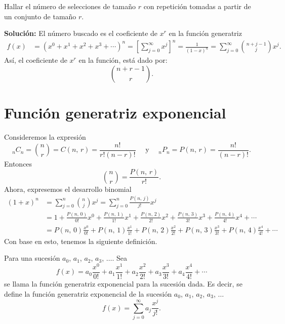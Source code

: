 \begin{myexample}
    Hallar el número de selecciones de tamaño $r$ con repetición tomadas a partir de un conjunto de tamaño $r$.

    \tcblower
    \textbf{\color{jblueleft}Solución:} El número buscado es el coeficiente de $x^{r}$ en la función generatriz
    \begin{align*}
        f(x) & = \left( x^{0} + x^{1} + x^{2} + x^{3} + \cdots \right)^{n} = \left[ \sum_{j=0}^{\infty} x^{j} \right]^n = \frac{1}{(1-x)^{n}} = \sum_{j=0}^{\infty} \binom{n+j-1}{j} x^{j}.
    \end{align*}
    Así, el coeficiente de $x^{r}$ en la función, está dado por:
    $$\binom{n+r-1}{r}.$$
\end{myexample}

\newpage

\section{Función generatriz exponencial}

\begin{BOX}
    Consideremos la expresión
    $${}_n C _n = \binom{n}{r} = C(n, \, r) = \frac{n!}{r!(n-r)!} \quad \text{ y } \quad {}_n P _n = P(n, \, r) = \frac{n!}{(n-r)!}.$$
    Entonces
    $$\binom{n}{r} = \frac{P(n, \, r)}{r!}.$$
    Ahora, expresemos el desarrollo binomial
    \begin{align*}
        (1 + x)^{n} & = \sum_{j=0}^{n} \binom{n}{j} x^{j} = \sum_{j=0}^{n} \frac{P(n, \, j)}{j!} x^{j} \\
        & = 1 + \frac{P(n, \, 0)}{0!} x^{0} + \frac{P(n, \, 1)}{1!} x^{1} + \frac{P(n, \, 2)}{2!} x^{2} + \frac{P(n, \, 3)}{3!} x^{3} + \frac{P(n, \, 4)}{4!} x^{4} + \cdots \\
        & = P(n, \, 0) \frac{x^{0}}{0!} + P(n, \, 1) \frac{x^{1}}{1!} + P(n, \, 2) \frac{x^{2}}{2!} + P(n, \, 3) \frac{x^{3}}{3!} + P(n, \, 4) \frac{x^{4}}{4!} + \cdots 
    \end{align*}
    Con base en esto, tenemos la siguiente definición.
\end{BOX}

\begin{definicion}{}{}
    Para una sucesión $a_0$, $a_1$, $a_2$, $a_3$, $\dots$. Sea
    $$f(x) = a_0 \frac{x^{0}}{0!} + a_1 \frac{x^{1}}{1!} + a_2 \frac{x^{2}}{2!} + a_3 \frac{x^{3}}{3!} + a_4 \frac{x^{4}}{4!} + \cdots$$
    se llama la función generatriz exponencial para la sucesión dada. Es decir, se define la función generatriz exponencial de la sucesión $a_0$, $a_1$, $a_2$, $a_3$, $\dots$
    $$f(x) = \sum_{j=0}^{\infty} a_j \frac{x^{j}}{j!}.$$
\end{definicion}

